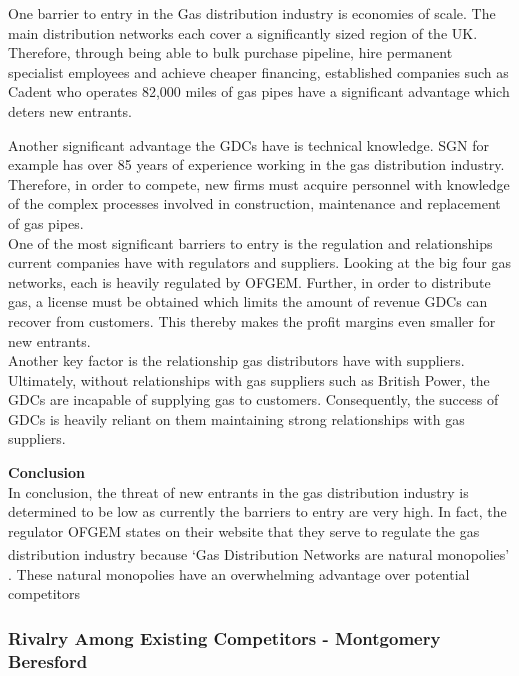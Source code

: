 \documentclass[11pt]{article}		%
\newcommand{\supercite}[1]{\textsuperscript{\cite{#1}}}		%
\begin{document}
                \hspace*{3ex}One barrier to entry in the Gas distribution industry is economies of scale. The main distribution networks each cover a significantly sized region of the UK. Therefore, through being able to bulk purchase pipeline, hire permanent specialist employees and achieve cheaper financing, established companies such as Cadent who operates 82,000 miles of gas pipes have a significant advantage which deters new entrants.
				\begin{floatingfigure}[r]{0pt} \end{floatingfigure}
                \hspace*{3ex}Another significant advantage the GDCs have is technical knowledge. SGN for example has over 85 years of experience working in the gas distribution industry. Therefore, in order to compete, new firms must acquire personnel with knowledge of the complex processes involved in construction, maintenance and replacement of gas pipes. \\
				One of the most significant barriers to entry is the regulation and relationships current companies have with regulators and suppliers. Looking at the big four gas networks, each is heavily regulated by OFGEM. Further, in order to distribute gas, a license must be obtained which limits the amount of revenue GDCs can recover from customers. This thereby makes the profit margins even smaller for new entrants. \\
	            \hspace*{3ex}Another key factor is the relationship gas distributors have with suppliers. Ultimately, without relationships with gas suppliers such as British Power, the GDCs are incapable of supplying gas to customers. Consequently, the success of GDCs is heavily reliant on them maintaining strong relationships with gas suppliers.

			    \textbf{Conclusion}
			    \\
                In conclusion, the threat of new entrants in the gas distribution industry is determined to be low as currently the barriers to entry are very high. In fact, the regulator OFGEM states on their website that they serve to regulate the gas distribution industry because ‘Gas Distribution Networks are natural monopolies’ \supercite{ofgemquote}. These natural monopolies have an overwhelming advantage over potential competitors
        
         \subsubsection[Rivalry Among Existing Competitors]{Rivalry Among Existing Competitors - Montgomery Beresford}
         
\end{document}
